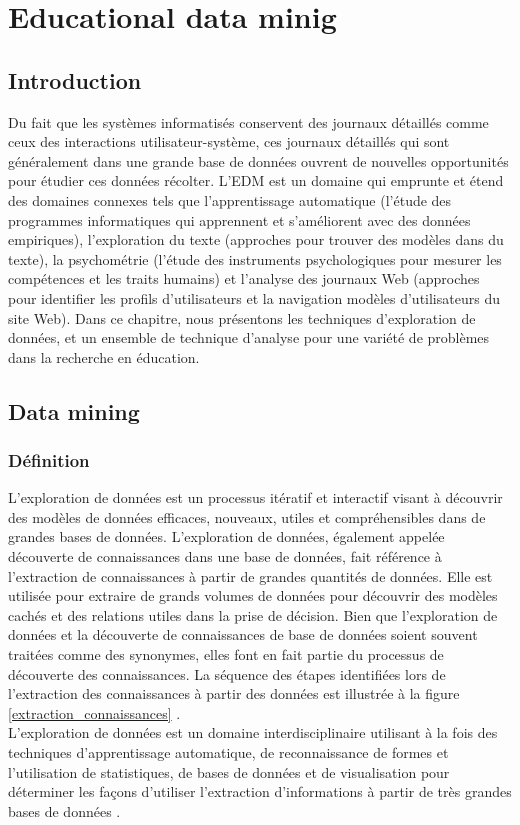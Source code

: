 \chapter{Educational data minig}\label{chap1}
\minitoc
\thispagestyle{empty}
\newpage	
	
\section{Introduction}
Du fait que les systèmes informatisés conservent des journaux détaillés comme ceux des interactions utilisateur-système, ces journaux détaillés qui sont généralement dans une grande base de données ouvrent de nouvelles opportunités pour étudier ces données récolter. L’EDM est un domaine qui emprunte et étend des domaines connexes tels que l’apprentissage automatique (l’étude des programmes informatiques qui apprennent et s’améliorent avec des données empiriques), l’exploration du texte (approches pour trouver des modèles dans du texte), la psychométrie (l’étude des instruments psychologiques pour mesurer les compétences et les traits humains) et l’analyse des journaux Web (approches pour identifier les profils d’utilisateurs et la navigation modèles d’utilisateurs du site Web). Dans ce chapitre, nous présentons les techniques d’exploration de données, et un ensemble de technique d’analyse pour une variété de problèmes dans la recherche en éducation.\\

\section{Data mining}

\subsection{Définition}
L'exploration de données est un processus itératif et interactif visant à découvrir des modèles de données efficaces, nouveaux, utiles et compréhensibles dans de grandes bases de données. L'exploration de données, également appelée découverte de connaissances dans une base de données, fait référence à l'extraction de connaissances à partir de grandes quantités de données. Elle est utilisée pour extraire de grands volumes de données pour découvrir des modèles cachés et des relations utiles dans la prise de décision. Bien que l'exploration de données et la découverte de connaissances de base de données soient souvent traitées comme des synonymes, elles font en fait partie du processus de découverte des connaissances. La séquence des étapes identifiées lors de l'extraction des connaissances à partir des données est illustrée à la figure \ref{extraction_connaissances} \cite{data_mining_concepts_techniques}.  \\
L'exploration de données est un domaine interdisciplinaire utilisant à la fois des techniques d'apprentissage automatique, de reconnaissance de formes et l'utilisation de statistiques, de bases de données et de visualisation pour déterminer les façons d'utiliser l'extraction d'informations à partir de très grandes bases de données \cite{cabena1998discovering}.

